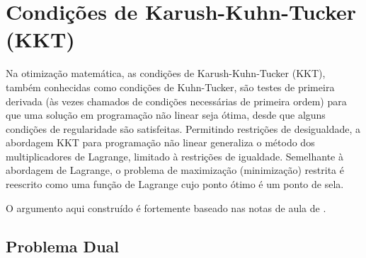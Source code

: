 \chapter{Condições de Karush-Kuhn-Tucker (KKT) \label{kkt}}

\localtableofcontents %


Na otimização matemática, as condições de Karush-Kuhn-Tucker (KKT), também conhecidas como condições de Kuhn-Tucker, são testes de primeira derivada (às vezes chamados de condições necessárias de primeira ordem) para que uma solução em programação não linear seja ótima, desde que alguns condições de regularidade são satisfeitas. Permitindo restrições de desigualdade, a abordagem KKT para programação não linear generaliza o método dos multiplicadores de Lagrange, limitado à restrições de igualdade. Semelhante à abordagem de Lagrange, o problema de maximização (minimização) restrita é reescrito como uma função de Lagrange cujo ponto ótimo é um ponto de sela.

O argumento aqui construído é fortemente baseado nas notas de aula de \textcite{tibshirani_convex_2015}.

\section{Problema Dual}
